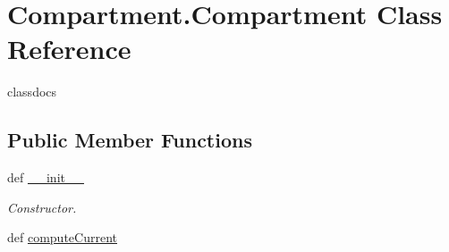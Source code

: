 \hypertarget{class_compartment_1_1_compartment}{\section{Compartment.\-Compartment Class Reference}
\label{class_compartment_1_1_compartment}
}


classdocs  


\subsection*{Public Member Functions}
\begin{DoxyCompactItemize}
\item 
def \hyperlink{class_compartment_1_1_compartment_af6abb8e8999054b0f4d99c440dc06e42}{\-\_\-\-\_\-init\-\_\-\-\_\-}
\begin{DoxyCompactList}\small\item\em Constructor. \end{DoxyCompactList}\item 
def \hyperlink{class_compartment_1_1_compartment_ab10c374833a5c36df0552d40e64e45b9}{compute\-Current}
\end{DoxyCompactItemize}

